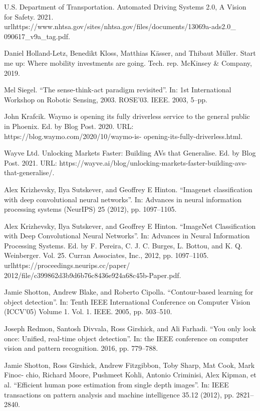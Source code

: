 \documentclass[english, LaM, oneside]{sapthesis}%
\begin{document}
\begin{thebibliography}{99}
 U.S. Department of Transportation. Automated Driving Systems 2.0, A Vision for Safety. 2021. url{https://www.nhtsa.gov/sites/nhtsa.gov/files/documents/13069a-ads2.0_ 090617_v9a_tag.pdf}.

 Daniel Holland-Letz, Benedikt Kloss, Matthias Kässer, and Thibaut Müller. Start me up: Where mobility investments are going. Tech. rep. McKinsey & Company, 2019.

 Mel Siegel. “The sense-think-act paradigm revisited”. In: 1st International Workshop on Robotic Sensing, 2003. ROSE’03. IEEE. 2003, 5–pp.

 John Krafcik. Waymo is opening its fully driverless service to the general public in Phoenix. Ed. by Blog Post. 2020. URL: https://blog.waymo.com/2020/10/waymo-is- opening-its-fully-driverless.html.

 Wayve Ltd. Unlocking Markets Faster: Building AVs that Generalise. Ed. by Blog Post. 2021. URL: https://wayve.ai/blog/unlocking-markets-faster-building-avs-that-generalise/.

 Alex Krizhevsky, Ilya Sutskever, and Geoffrey E Hinton. “Imagenet classification with deep convolutional neural networks”. In: Advances in neural information processing systems (NeurIPS) 25 (2012), pp. 1097–1105.

 Alex Krizhevsky, Ilya Sutskever, and Geoffrey E Hinton. “ImageNet Classification with Deep Convolutional Neural Networks”. In: Advances in Neural Information Processing Systems. Ed. by F. Pereira, C. J. C. Burges, L. Bottou, and K. Q. Weinberger. Vol. 25. Curran Associates, Inc., 2012, pp. 1097–1105. url{https://proceedings.neurips.cc/paper/ 2012/file/c399862d3b9d6b76c8436e924a68c45b-Paper.pdf}.

 Jamie Shotton, Andrew Blake, and Roberto Cipolla. “Contour-based learning for object detection”. In: Tenth IEEE International Conference on Computer Vision (ICCV’05) Volume 1. Vol. 1. IEEE. 2005, pp. 503–510.

 Joseph Redmon, Santosh Divvala, Ross Girshick, and Ali Farhadi. “You only look once: Unified, real-time object detection”. In: the IEEE conference on computer vision and pattern recognition. 2016, pp. 779–788.

 Jamie Shotton, Ross Girshick, Andrew Fitzgibbon, Toby Sharp, Mat Cook, Mark Finoc- chio, Richard Moore, Pushmeet Kohli, Antonio Criminisi, Alex Kipman, et al. “Efficient human pose estimation from single depth images”. In: IEEE transactions on pattern analysis and machine intelligence 35.12 (2012), pp. 2821–2840.


\end{thebibliography}
\end{document}
